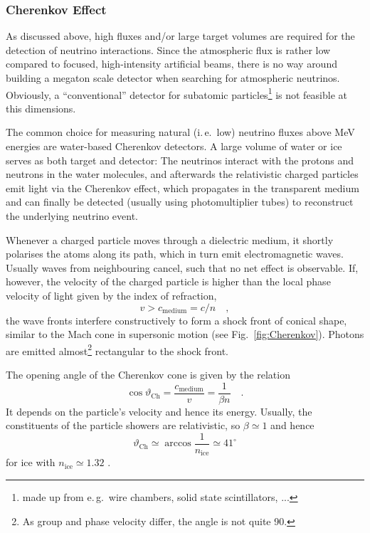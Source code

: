 \subsubsection{Cherenkov Effect}

As discussed above, high fluxes and/or large target volumes are required for 
the detection of neutrino interactions. Since the atmospheric flux is rather 
low compared to focused, high-intensity artificial beams, there is no way 
around building a megaton scale detector when searching for atmospheric 
neutrinos. Obviously, a ``conventional'' detector for subatomic 
particles\footnote{made up from e.\,g.\ wire chambers, solid state 
scintillators, ...} is not feasible at this dimensions.

The common choice for measuring natural (i.\,e.\ low) neutrino fluxes above 
MeV energies are water-based Cherenkov detectors. A large volume of water or 
ice serves as both target and detector: The neutrinos interact with the protons 
and neutrons in the water molecules, and afterwards the relativistic charged 
particles emit light via the Cherenkov effect, which propagates in the 
transparent medium and can finally be detected (usually using photomultiplier 
tubes) to reconstruct the underlying neutrino event.


Whenever a charged particle moves through a dielectric medium, it shortly 
polarises the atoms along its path, which in turn emit electromagnetic waves. 
Usually waves from neighbouring cancel, such that no net effect is observable. 
If, however, the velocity of the charged particle is higher than the local 
phase velocity of light given by the index of refraction,
\begin{equation}
 v > c_{\mathrm{medium}} = c/n \quad,
\end{equation}
the wave fronts interfere constructively to form a shock front of conical 
shape, similar to the Mach cone in supersonic motion (see 
Fig.~\ref{fig:Cherenkov}). Photons are emitted almost\footnote{As group and 
phase velocity differ, the angle is not quite 90\textdegree.} rectangular to 
the shock front.

The opening angle of the Cherenkov cone is given by the relation
\begin{equation}
  \cos \vartheta_{\mathrm{Ch}} = 
      \frac{c_{\mathrm{medium}}}{v} = \frac{1}{\beta n} \quad.
\end{equation}
It depends on the particle's velocity and hence its energy. Usually, the 
constituents of the particle showers are relativistic, so $\beta \simeq 1$ and 
hence 
\begin{equation}
  \vartheta_{\mathrm{Ch}} \simeq \arccos \frac{1}{n_{\mathrm{ice}}} 
      \simeq \mathrm{41^{\circ}}
  \label{eqn:ChkovAngle}
\end{equation}
for ice with $n_{\mathrm{ice}} \simeq 1.32$ \cite{PriceWoschnagg}.

